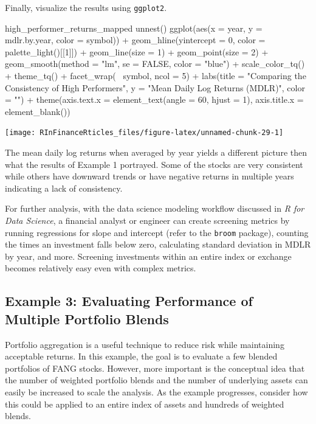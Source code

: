 \hspace{20 mm}

Finally, visualize the results using \texttt{ggplot2}.

\begin{Schunk}
\begin{Sinput}
high_performer_returns_mapped %
    unnest() %
    ggplot(aes(x = year, y = mdlr.by.year, color = symbol)) +
    geom_hline(yintercept = 0, color = palette_light()[[1]]) +
    geom_line(size = 1) +
    geom_point(size = 2) +
    geom_smooth(method = "lm", se = FALSE, color = "blue") +
    scale_color_tq() +
    theme_tq() +
    facet_wrap(~ symbol, ncol = 5) +
    labs(title = "Comparing the Consistency of High Performers",
         y = "Mean Daily Log Returns (MDLR)", color = "") +
    theme(axis.text.x = element_text(angle = 60, hjust = 1),
          axis.title.x = element_blank())
\end{Sinput}


\begin{center}\texttt{[image: RInFinanceRticles\_files/figure-latex/unnamed-chunk-29-1]} \end{center}

\end{Schunk}

The mean daily log returns when averaged by year yields a different
picture then what the results of Example 1 portrayed. Some of the stocks
are very consistent while others have downward trends or have negative
returns in multiple years indicating a lack of consistency.

For further analysis, with the data science modeling workflow discussed
in \emph{R for Data Science}, a financial analyst or engineer can create
screening metrics by running regressions for slope and intercept (refer
to the \texttt{broom} package), counting the times an investment falls
below zero, calculating standard deviation in MDLR by year, and more.
Screening investments within an entire index or exchange becomes
relatively easy even with complex metrics.

\subsection{Example 3: Evaluating Performance of Multiple Portfolio
Blends}\label{example-3-evaluating-performance-of-multiple-portfolio-blends}

Portfolio aggregation is a useful technique to reduce risk while
maintaining acceptable returns. In this example, the goal is to evaluate
a few blended portfolios of FANG stocks. However, more important is the
conceptual idea that the number of weighted portfolio blends and the
number of underlying assets can easily be increased to scale the
analysis. As the example progresses, consider how this could be applied
to an entire index of assets and hundreds of weighted blends.

